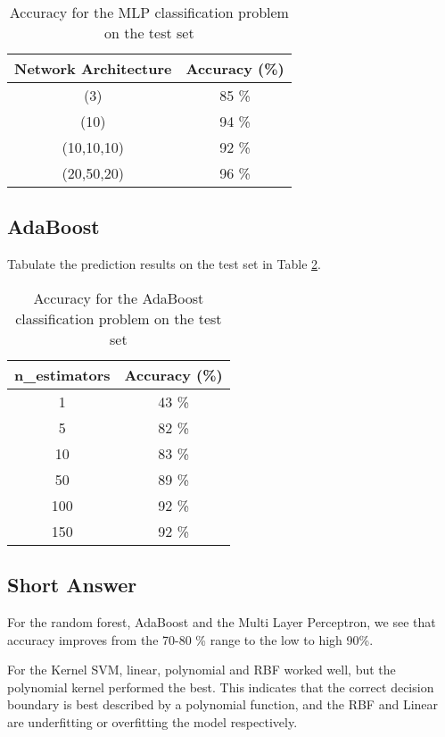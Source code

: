 \begin{table}[H]
\centering
\begin{tabular}{ |c|c| } 
 \hline
 \textbf{Network Architecture} & \textbf{Accuracy (\%)} \\
 \hline
 (3) & 85 \% \\ 
 (10) & 94 \% \\
 (10,10,10) & 92 \% \\ 
 (20,50,20) & 96 \% \\ 
 \hline
\end{tabular}
\caption{Accuracy for the MLP classification problem on the test set}
\label{mlpTable}
\end{table}

\subsection{AdaBoost}
Tabulate the prediction results on the test set in Table \ref{ABTable}.


\begin{table}[H]
\centering
\begin{tabular}{ |c|c| } 
 \hline
 \textbf{n\_estimators} & \textbf{Accuracy (\%)} \\
 \hline
 1 & 43 \% \\ 
  5 & 82 \%\\ 
 10 & 83 \% \\
 50 & 89 \% \\ 
 100 & 92 \% \\ 
 150 & 92 \% \\
 \hline
\end{tabular}
\caption{Accuracy for the AdaBoost classification problem on the test set}
\label{ABTable}
\end{table}
\subsection{Short Answer}

For the random forest, AdaBoost and the Multi Layer Perceptron, we see that accuracy improves from the 70-80 \% range to the low to high 90\%. 

For the Kernel SVM, linear, polynomial and RBF worked well, but the polynomial kernel performed the best. This indicates that the correct decision boundary is best described by a polynomial function, and the RBF and Linear are underfitting or overfitting the model respectively.